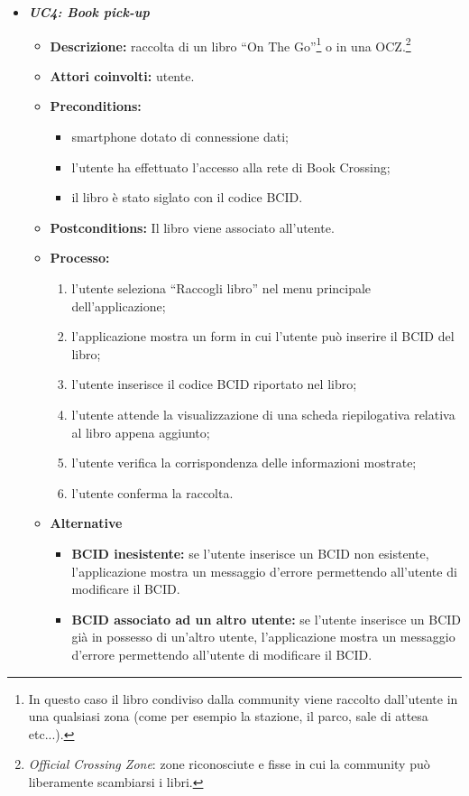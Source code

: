 \begin{itemize}
	\item \textit{\textbf{UC4: Book pick-up}}
	\begin{itemize}
		\item \textbf{Descrizione:} raccolta di un libro “On The Go”\footnote{In questo caso il libro condiviso dalla community viene raccolto dall'utente in una qualsiasi zona (come per esempio la stazione, il parco, sale di attesa etc...).} o in una OCZ.\footnote{\textit{Official Crossing Zone}: zone riconosciute e fisse in cui la community può liberamente scambiarsi i libri.}
		\item \textbf{Attori coinvolti:} utente.
		\item \textbf{Preconditions:}
		\begin{itemize}
			\item smartphone dotato di connessione dati;
			\item l’utente ha effettuato l’accesso alla rete di Book Crossing;
			\item il libro è stato siglato con il codice BCID.
		\end{itemize}
		\item \textbf{Postconditions:} Il libro viene associato all’utente.
		\item \textbf{Processo:}
		\begin{enumerate}
			\item l’utente seleziona “Raccogli libro” nel menu principale dell’applicazione;
			\item l’applicazione mostra un form in cui l’utente può inserire il BCID del libro;
			\item l’utente inserisce il codice BCID riportato nel libro;
			\item l'utente attende la visualizzazione di una scheda riepilogativa relativa al libro appena aggiunto;
			\item l’utente verifica la corrispondenza delle informazioni mostrate;
			\item l'utente conferma la raccolta.
		\end{enumerate}
		\item \textbf{Alternative}
		\begin{itemize}
			\item \textbf{BCID inesistente:} se l'utente inserisce un BCID non esistente, l'applicazione mostra un messaggio d'errore permettendo all'utente di modificare il BCID.
			\item \textbf{BCID associato ad un altro utente:} se l'utente inserisce un BCID già in possesso di un'altro utente, l'applicazione mostra un messaggio d'errore permettendo all'utente di modificare il BCID.

\end{itemize}
\end{itemize}
\end{itemize}
